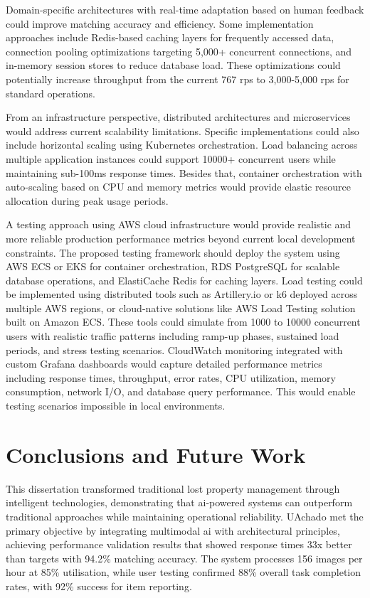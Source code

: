 Domain-specific architectures with real-time adaptation based on human feedback could improve matching accuracy and efficiency. Some implementation approaches include Redis-based caching layers for frequently accessed data, connection pooling optimizations targeting 5,000+ concurrent connections, and in-memory session stores to reduce database load. These optimizations could potentially increase throughput from the current 767 \ac{rps} to 3,000-5,000 \ac{rps} for standard operations.

From an infrastructure perspective, distributed architectures and microservices would address current scalability limitations. Specific implementations could also include horizontal scaling using Kubernetes orchestration. Load balancing across multiple application instances could support 10000+ concurrent users while maintaining sub-100ms response times. Besides that, container orchestration with auto-scaling based on CPU and memory metrics would provide elastic resource allocation during peak usage periods.

A testing approach using AWS cloud infrastructure would provide realistic and more reliable production performance metrics beyond current local development constraints. The proposed testing framework should deploy the system using AWS ECS or EKS for container orchestration, RDS PostgreSQL for scalable database operations, and ElastiCache Redis for caching layers. Load testing could be implemented using distributed tools such as Artillery.io or k6 deployed across multiple AWS regions, or cloud-native solutions like AWS Load Testing solution built on Amazon ECS. These tools could simulate from 1000 to 10000 concurrent users with realistic traffic patterns including ramp-up phases, sustained load periods, and stress testing scenarios. CloudWatch monitoring integrated with custom Grafana dashboards would capture detailed performance metrics including response times, throughput, error rates, CPU utilization, memory consumption, network I/O, and database query performance. This would enable testing scenarios impossible in local environments.


\section{Conclusions and Future Work} \label{section:conclusions_future_work}

This dissertation transformed traditional lost property management through intelligent technologies, demonstrating that \ac{ai}-powered systems can outperform traditional approaches while maintaining operational reliability. UAchado met the primary objective by integrating multimodal \ac{ai} with architectural principles, achieving performance validation results that showed response times 33x better than targets with 94.2\% matching accuracy. The system processes 156 images per hour at 85\% utilisation, while user testing confirmed 88\% overall task completion rates, with 92\% success for item reporting.

